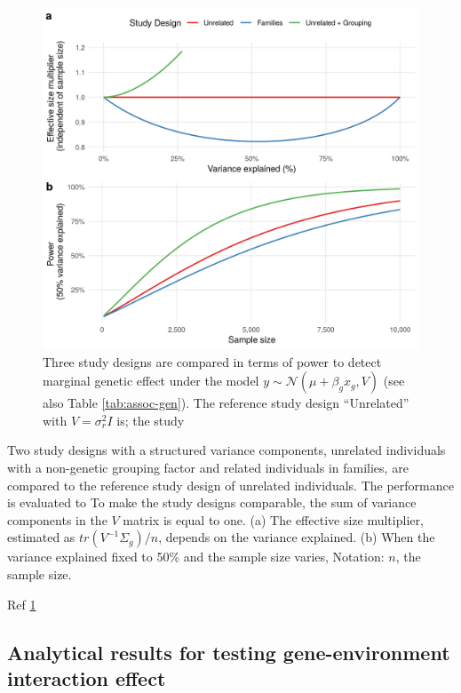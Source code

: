 \documentclass[]{book}
\begin{document}
\begin{figure}

{\centering \includegraphics[width=0.75\linewidth]{figures/07-figure-power-marginal-two-panels} 

}

\caption{Three study designs are compared in terms of power
to detect marginal genetic effect under the model
\(y \sim \mathcal{N}(\mu + \beta_g x_g, V)\) (see also Table
\ref{tab:assoc-gen}). The reference study design ``Unrelated'' with
\(V = \sigma^2_r I\) is; the study}\label{fig:power-marginal}
\end{figure}







Two study designs with a structured variance components, unrelated
individuals with a non-genetic grouping factor and related individuals
in families, are compared to the reference study design of unrelated
individuals. The performance is evaluated to To make the study designs
comparable, the sum of variance components in the \(V\) matrix is equal
to one. (a) The effective size multiplier, estimated as
\(tr(V^{-1} \Sigma_g) / n\), depends on the variance explained. (b) When
the variance explained fixed to 50\% and the sample size varies,
Notation: \(n\), the sample size.

Ref \ref{fig:power-marginal}

\subsection{Analytical results for testing gene-environment interaction
effect}\label{analytical-results-for-testing-gene-environment-interaction-effect}
\end{document}
